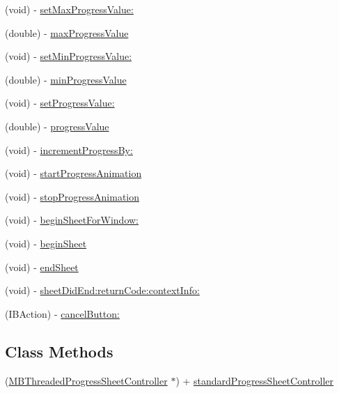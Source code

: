 \begin{DoxyCompactItemize}
\item 
(void) -\/ \hyperlink{interface_m_b_threaded_progress_sheet_controller_a96b78bc96a02afb02e1da4faa635533e}{set\-Max\-Progress\-Value\-:}
\item 
(double) -\/ \hyperlink{interface_m_b_threaded_progress_sheet_controller_ae86a5ae27d85d9873d02a8f5f590c2ef}{max\-Progress\-Value}
\item 
(void) -\/ \hyperlink{interface_m_b_threaded_progress_sheet_controller_ae5fb502ea4858c319cd1b0302e6cdd83}{set\-Min\-Progress\-Value\-:}
\item 
(double) -\/ \hyperlink{interface_m_b_threaded_progress_sheet_controller_a0113cfeffaf72cf5ca7fd3e0456547cd}{min\-Progress\-Value}
\item 
(void) -\/ \hyperlink{interface_m_b_threaded_progress_sheet_controller_a3159d8e390983be7cc0712e176e36b18}{set\-Progress\-Value\-:}
\item 
(double) -\/ \hyperlink{interface_m_b_threaded_progress_sheet_controller_a045057d0ad39d4367c2eb43203061a3c}{progress\-Value}
\item 
(void) -\/ \hyperlink{interface_m_b_threaded_progress_sheet_controller_af5125efdbc14423c2716207cc22388ee}{increment\-Progress\-By\-:}
\item 
(void) -\/ \hyperlink{interface_m_b_threaded_progress_sheet_controller_a76f768a1588a3dee3d0ae08939156996}{start\-Progress\-Animation}
\item 
(void) -\/ \hyperlink{interface_m_b_threaded_progress_sheet_controller_a6c377016e2cceb931938a3086da5f808}{stop\-Progress\-Animation}
\item 
(void) -\/ \hyperlink{interface_m_b_threaded_progress_sheet_controller_a5ffece74583930f9d76d8f1e9caf4514}{begin\-Sheet\-For\-Window\-:}
\item 
(void) -\/ \hyperlink{interface_m_b_threaded_progress_sheet_controller_ab2bc9af004e55b53e6776a60139bd9da}{begin\-Sheet}
\item 
(void) -\/ \hyperlink{interface_m_b_threaded_progress_sheet_controller_ad73bf69ade5214ad7f61681509587167}{end\-Sheet}
\item 
(void) -\/ \hyperlink{interface_m_b_threaded_progress_sheet_controller_aee63616e91e1e8e9c103fbbdbd2b225e}{sheet\-Did\-End\-:return\-Code\-:context\-Info\-:}
\item 
(I\-B\-Action) -\/ \hyperlink{interface_m_b_threaded_progress_sheet_controller_a64298c968d2fd45cf80a86a3e2137b1c}{cancel\-Button\-:}
\end{DoxyCompactItemize}
\subsection*{Class Methods}
\begin{DoxyCompactItemize}
\item 
(\hyperlink{interface_m_b_threaded_progress_sheet_controller}{M\-B\-Threaded\-Progress\-Sheet\-Controller} $\ast$) + \hyperlink{interface_m_b_threaded_progress_sheet_controller_adc6ba9fce0f1b54cbefcf860c6dda011}{standard\-Progress\-Sheet\-Controller}
\end{DoxyCompactItemize}
